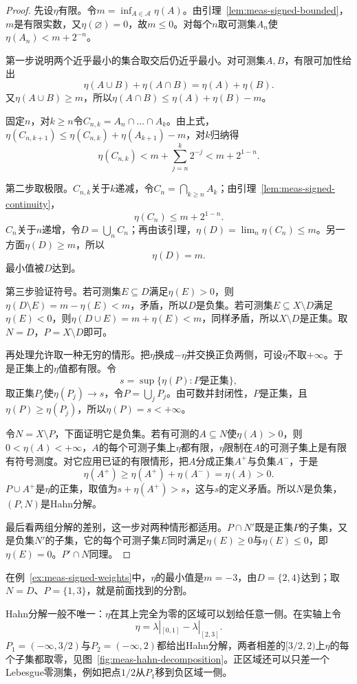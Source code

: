 \begin{proof}
先设$\eta$有限。令$m=\inf_{A\in\mathcal A}\eta(A)$。由引理~\ref{lem:meas-signed-bounded}，$m$是有限实数，又$\eta(\varnothing)=0$，故$m\leq0$。对每个$n$取可测集$A_n$使$\eta(A_n)<m+2^{-n}$。

第一步说明两个近乎最小的集合取交后仍近乎最小。对可测集$A,B$，有限可加性给出
\[
 \eta(A\cup B)+\eta(A\cap B)=\eta(A)+\eta(B).
\]
又$\eta(A\cup B)\geq m$，所以$\eta(A\cap B)\leq\eta(A)+\eta(B)-m$。

固定$n$，对$k\geq n$令$C_{n,k}=A_n\cap\dots\cap A_k$。由上式，$\eta(C_{n,k+1})\leq\eta(C_{n,k})+\eta(A_{k+1})-m$，对$k$归纳得
\[
 \eta(C_{n,k})<m+\sum_{j=n}^{k}2^{-j}<m+2^{1-n}.
\]

第二步取极限。$C_{n,k}$关于$k$递减，令$C_n=\bigcap_{k\geq n}A_k$；由引理~\ref{lem:meas-signed-continuity}，
\[
 \eta(C_n)\leq m+2^{1-n}.
\]
$C_n$关于$n$递增，令$D=\bigcup_nC_n$；再由该引理，$\eta(D)=\lim_n\eta(C_n)\leq m$。另一方面$\eta(D)\geq m$，所以
\[
 \eta(D)=m.
\]
最小值被$D$达到。

第三步验证符号。若可测集$E\subseteq D$满足$\eta(E)>0$，则$\eta(D\setminus E)=m-\eta(E)<m$，矛盾，所以$D$是负集。若可测集$E\subseteq X\setminus D$满足$\eta(E)<0$，则$\eta(D\cup E)=m+\eta(E)<m$，同样矛盾，所以$X\setminus D$是正集。取$N=D$，$P=X\setminus D$即可。

再处理允许取一种无穷的情形。把$\eta$换成$-\eta$并交换正负两侧，可设$\eta$不取$+\infty$。于是正集上的$\eta$值都有限。令
\[
 s=\sup\{\eta(P):P\text{是正集}\},
\]
取正集$P_j$使$\eta(P_j)\to s$，令$P=\bigcup_jP_j$。由可数并封闭性，$P$是正集，且$\eta(P)\geq\eta(P_j)$，所以$\eta(P)=s<+\infty$。

令$N=X\setminus P$，下面证明它是负集。若有可测的$A\subseteq N$使$\eta(A)>0$，则$0<\eta(A)<+\infty$，$A$的每个可测子集上$\eta$都有限，$\eta$限制在$A$的可测子集上是有限有符号测度。对它应用已证的有限情形，把$A$分成正集$A^+$与负集$A^-$，于是
\[
 \eta(A^+)\geq\eta(A^+)+\eta(A^-)=\eta(A)>0.
\]
$P\cup A^+$是$\eta$的正集，取值为$s+\eta(A^+)>s$，这与$s$的定义矛盾。所以$N$是负集，$(P,N)$是Hahn分解。

最后看两组分解的差别，这一步对两种情形都适用。$P\cap N'$既是正集$P$的子集，又是负集$N'$的子集，它的每个可测子集$E$同时满足$\eta(E)\geq0$与$\eta(E)\leq0$，即$\eta(E)=0$。$P'\cap N$同理。
\end{proof}

在例~\ref{ex:meas-signed-weights}中，$\eta$的最小值是$m=-3$，由$D=\{2,4\}$达到；取$N=D$、$P=\{1,3\}$，就是前面找到的分割。

Hahn分解一般不唯一：$\eta$在其上完全为零的区域可以划给任意一侧。在实轴上令
\[
 \eta=\lambda|_{[0,1]}-\lambda|_{[2,3]}.
\]
$P_1=(-\infty,3/2)$与$P_2=(-\infty,2)$都给出Hahn分解，两者相差的$[3/2,2)$上$\eta$的每个子集都取零，见图~\ref{fig:meas-hahn-decomposition}。正区域还可以只差一个Lebesgue零测集，例如把点$1/2$从$P_1$移到负区域一侧。

